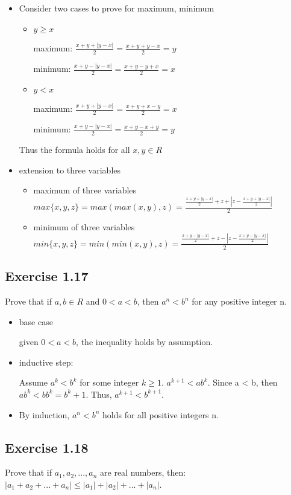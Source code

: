\documentclass[12pt]{article}
\begin{document}
			\begin{itemize}
				\item Consider two cases to prove for maximum, minimum
					\begin{itemize}
						\item $y \ge x$
							
							maximum: $\frac{x+y+|y-x|}{2} = \frac{x+y+y-x}{2} = y$
							
							minimum:
							$\frac{x+y-|y-x|}{2} = \frac{x+y-y+x}{2} = x$
						\item $y < x$
						
							maximum:
							$\frac{x+y+|y-x|}{2} = \frac{x+y+x-y}{2} = x$
							
							minimum:
							$\frac{x+y-|y-x|}{2} = \frac{x+y-x+y}{2} = y$
					\end{itemize}
					Thus the formula holds for all $x,y \in R$
				\item extension to three variables
					\begin{itemize}
						\item maximum of three variables
							$max\{x,y,z\} = max(max(x,y),z) = \frac{\frac{x+y+|y-x|}{2} + z + |z - \frac{x+y+|y-x|}{2}|}{2}$
						\item minimum of three variables
							$min\{x,y,z\} = min(min(x,y),z) = \frac{\frac{x+y-|y-x|}{2} + z - |z - \frac{x+y-|y-x|}{2}|}{2}$
					\end{itemize}
			\end{itemize}
		\subsection*{Exercise 1.17}
			Prove that if $a,b \in R$ and $0<a<b$, then $a^n<b^n$ for any positive integer n.
			\begin{itemize}
				\item base case
				
				given $0 < a < b$, the inequality holds by assumption.
				
				\item inductive step:
				
				Assume $a^k < b^k$ for some integer $k \ge 1$. $a^{k+1} < ab^k$. Since a < b, then $ab^k < bb^k = b^k+1$. Thus, $a^{k+1} < b^{k+1}$.
				
				\item By induction, $a^n < b^n$ holds for all positive integers n.
			\end{itemize}
		\subsection*{Exercise 1.18}
			Prove that if $a_1, a_2, ..., a_n$ are real numbers, then: $|a_1 + a_2 + ... + a_n| \le |a_1|+|a_2|+...+|a_n|$.
				
\end{document}
